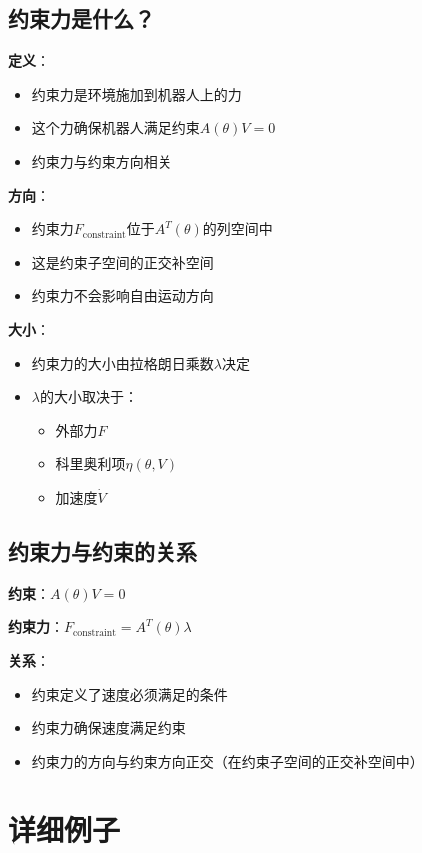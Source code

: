 \documentclass[12pt,a4paper]{article}
\begin{document}
\subsection{约束力是什么？}

\textbf{定义}：
\begin{itemize}
\item 约束力是环境施加到机器人上的力
\item 这个力确保机器人满足约束$A(\theta)V = 0$
\item 约束力与约束方向相关
\end{itemize}

\textbf{方向}：
\begin{itemize}
\item 约束力$F_{\text{constraint}}$位于$A^T(\theta)$的列空间中
\item 这是约束子空间的正交补空间
\item 约束力不会影响自由运动方向
\end{itemize}

\textbf{大小}：
\begin{itemize}
\item 约束力的大小由拉格朗日乘数$\lambda$决定
\item $\lambda$的大小取决于：
\begin{itemize}
\item 外部力$F$
\item 科里奥利项$\eta(\theta, V)$
\item 加速度$\dot{V}$
\end{itemize}
\end{itemize}

\subsection{约束力与约束的关系}

\textbf{约束}：$A(\theta)V = 0$

\textbf{约束力}：$F_{\text{constraint}} = A^T(\theta)\lambda$

\textbf{关系}：
\begin{itemize}
\item 约束定义了速度必须满足的条件
\item 约束力确保速度满足约束
\item 约束力的方向与约束方向正交（在约束子空间的正交补空间中）
\end{itemize}

\section{详细例子}
\end{document}
